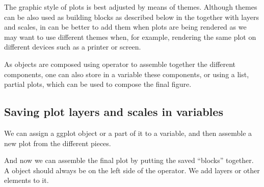 \documentclass[krantz2]{krantz}\usepackage{knitr}%
\begin{document}
The graphic style of plots is best adjusted by means of themes. Although themes can be also used as building blocks as described below in the together with layers and scales, in can be better to add them when plots are being rendered as we may want to use different themes when, for example, rendering the same plot on different devices such as a printer or screen.

As  objects are composed using operator \code{+} to assemble together the different components, one can also store in a variable these components, or using a list, partial plots, which can be used to compose the final figure.

\subsection{Saving plot layers and scales in variables}

We can assign a ggplot object or a part of it to a variable, and then assemble a new plot from the different pieces.

\begin{knitrout}\footnotesize
{}\color{fgcolor}\begin{kframe}
\begin{alltt}
 \hlkwb{<-} \hlstd{(} 
                 \hlstd{(}   
                  \hlstd{=}  \hlopt{+}
          \hlstd{()}

 \hlkwb{<-} \hlstd{(} \hlstd{=} \hlstd{,}
                \hlstd{=} \hlstd{,}
                \hlstd{=} \hlstd{,}
                \hlstd{=} \hlstd{)}
\end{alltt}
\end{kframe}
\end{knitrout}

And now we can assemble the final plot by putting the saved ``blocks'' together. A  object should always be on the left side of the \code{+} operator. We add layers or other elements to it.
\end{document}
